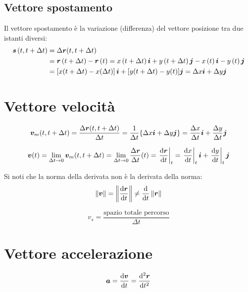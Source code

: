 \subsection{Vettore spostamento}
\begin{Def}
  Il  vettore spostamento è la variazione (differenza) del vettore posizione tra due istanti diversi:
  \begin{align*}
    \boldsymbol{s}\left(t,t+\Delta t\right) & =\Delta \boldsymbol{r}(t,t+\Delta t)                                                                                                                             \\
                                   & =\boldsymbol{r}\left(t+\Delta t\right)-\boldsymbol{r}\left(t\right)=x\left(t+\Delta t\right)\boldsymbol{i}+y\left(t+\Delta t\right)\boldsymbol{j}-x\left(t\right)\boldsymbol{i}-y\left(t\right)\boldsymbol{j} \\
                                   & =\left[x(t+\Delta t)-x(\Delta t)\right]\boldsymbol{i}+[y(t+\Delta t)-y(t)]\boldsymbol{j}=\Delta x\boldsymbol{i}+\Delta y \boldsymbol{j}
  \end{align*}
\end{Def}
\section{Vettore velocità}
\begin{Def}
  \[\boldsymbol{v}_m(t,t+\Delta t)=\frac{\Delta\boldsymbol{r}(t,t+\Delta t)}{\Delta
      t}=\frac{1}{\Delta t}\{\Delta x\boldsymbol{i}+\Delta y\boldsymbol{j}\}=\frac{\Delta x}{\Delta t}\boldsymbol{i}+\frac{\Delta y}{\Delta t}\boldsymbol{j}\]
\end{Def}
\begin{Def}
  \[\boldsymbol{v}(t)=\lim_{\Delta t\rightarrow 0}\boldsymbol{v}_m(t,t+\Delta t)=\lim_{\Delta t\rightarrow 0} \frac{\Delta\boldsymbol{r}}{\Delta t}(t)={\left.\frac{\mathrm{d} \boldsymbol{r}}{\mathrm{d} t}\right|_t}=\left.\frac{\mathrm{d} x}{\mathrm{d} t}\right|_t\boldsymbol{i}+\left.\frac{\mathrm{d} y}{\mathrm{d} t}\right|_t\boldsymbol{j}\]
\end{Def}
Si noti che la norma della derivata non è la derivata della norma:
\[\left\lVert\boldsymbol{v}\right\rVert=\left\lVert\frac{\mathrm{d}\boldsymbol{r}}{\mathrm{d} t}\right\rVert\neq\frac{\mathrm{d}}{\mathrm{d} t}\left\lVert\boldsymbol{r}\right\rVert\]
\begin{Def}
  \[v_s=\frac{\text{spazio totale percorso}}{\Delta t}\]
\end{Def}
\section{Vettore accelerazione}
\begin{Def}
  \[\boldsymbol{a}=\frac{\mathrm{d} \boldsymbol{v}}{\mathrm{d} t}={\frac{\mathrm{d}^2 \boldsymbol{r}}{\mathrm{d} t^2}}\]
\end{Def}
